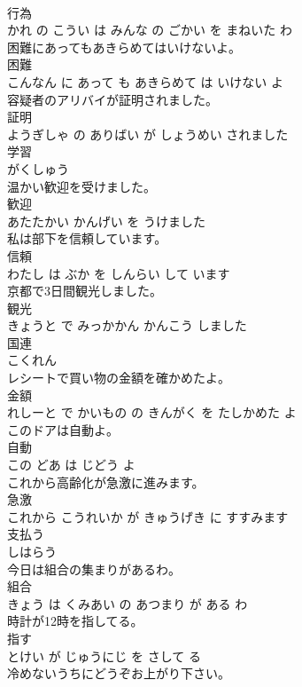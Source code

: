 \documentclass[8pt]{extreport}
\begin{document}
\begin{CJK}{UTF8}{min}
\\	行為 
\\	かれ の こうい は みんな の ごかい を まねいた わ		
\\	困難にあってもあきらめてはいけないよ。	
\\	困難 
\\	こんなん に あって も あきらめて は いけない よ		
\\	容疑者のアリバイが証明されました。	
\\	証明 
\\	ようぎしゃ の ありばい が しょうめい されました		
\\	学習	
\\	がくしゅう		
\\	温かい歓迎を受けました。	
\\	歓迎 
\\	あたたかい かんげい を うけました		
\\	私は部下を信頼しています。	
\\	信頼 
\\	わたし は ぶか を しんらい して います		
\\	京都で3日間観光しました。	
\\	観光 
\\	きょうと で みっかかん かんこう しました		
\\	国連	
\\	こくれん		
\\	レシートで買い物の金額を確かめたよ。	
\\	金額 
\\	れしーと で かいもの の きんがく を たしかめた よ		
\\	このドアは自動よ。	
\\	自動 
\\	この どあ は じどう よ		
\\	これから高齢化が急激に進みます。	
\\	急激 
\\	これから こうれいか が きゅうげき に すすみます		
\\	支払う	
\\	しはらう		
\\	今日は組合の集まりがあるわ。	
\\	組合 
\\	きょう は くみあい の あつまり が ある わ		
\\	時計が12時を指してる。	
\\	指す 
\\	とけい が じゅうにじ を さして る		
\\	冷めないうちにどうぞお上がり下さい。	

\end{CJK}
\end{document}

